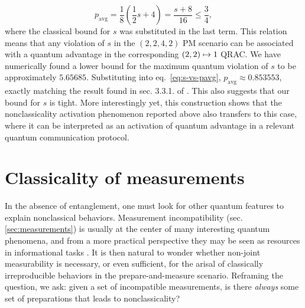            \begin{equation}
                p_{\text{avg}} = \frac{1}{8} \left( \frac{1}{2} s + 4 \right) = \frac{s + 8}{16} \leq \frac{3}{4} ,
                \label{eq:s-vs-pavg}
            \end{equation}
            where the classical bound for $s$ was substituted in the last term. This relation means that any violation of $s$ in the $(2,2,4,2)$ PM scenario can be associated with a quantum advantage in the corresponding $\left( 2, 2 \right) \mapsto 1$ QRAC. We have numerically found a lower bound for the maximum quantum violation of $s$ to be approximately $5.65685$. Substituting into eq.~\eqref{eq:s-vs-pavg}, $p_{\text{avg}} \approx 0.853553$, exactly matching the result found in sec. 3.3.1. of \cite{ambainis_srqracs_2009}. This also suggests that our bound for $s$ is tight. More interestingly yet, this construction shows that the nonclassicality activation phenomenon reported above also transfers to this case, where it can be interpreted as an activation of quantum advantage in a relevant quantum communication protocol. 


    \section{Classicality of measurements}
    \label{sec:measurement-classicality}

        In the absence of entanglement, one must look for other quantum features to explain nonclassical behaviors. Measurement incompatibility (sec. \ref{sec:measurements}) is usually at the center of many interesting quantum phenomena, and from a more practical perspective they may be seen as resources in informational tasks \cite{giovannetti_metrology_2006}. It is then natural to wonder whether non-joint measurability is necessary, or even sufficient, for the arisal of classically irreproducible behaviors in the prepare-and-measure scenario. Reframing the question, we ask: given a set of incompatible measurements, is there \emph{always} some set of preparations that leads to nonclassicality?

